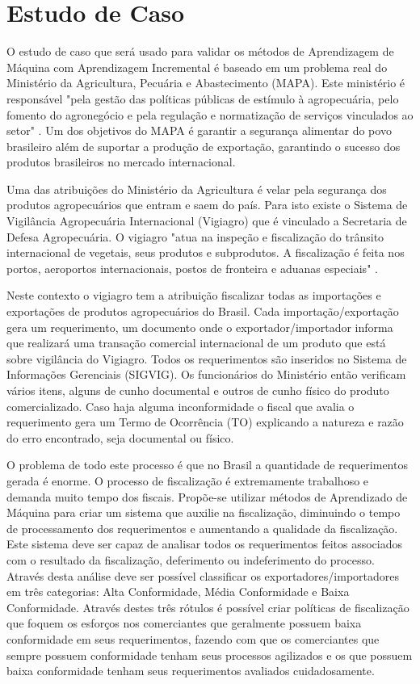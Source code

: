 \chapter{Estudo de Caso}
O estudo de caso que será usado para validar os métodos de Aprendizagem de Máquina com Aprendizagem Incremental é baseado em um problema real do Ministério da Agricultura, Pecuária e Abastecimento (MAPA). Este ministério é responsável  "pela gestão das políticas públicas de estímulo à agropecuária, pelo fomento do agronegócio e pela regulação e normatização de serviços vinculados ao setor" \cite{mapa}. Um dos objetivos do MAPA é garantir a segurança alimentar do povo brasileiro além de suportar a produção de exportação, garantindo o sucesso dos produtos brasileiros no mercado internacional.

Uma das atribuições do Ministério da Agricultura é velar pela segurança dos produtos agropecuários que entram e saem do país. Para isto existe o Sistema de Vigilância Agropecuária Internacional (Vigiagro) que é vinculado a Secretaria de Defesa Agropecuária. O vigiagro "atua na inspeção e fiscalização do trânsito internacional de vegetais, seus produtos e subprodutos. A fiscalização é feita nos portos, aeroportos internacionais, postos de fronteira e aduanas especiais" \cite{vigiagro}.

Neste contexto o vigiagro tem a atribuição fiscalizar todas as importações e exportações de produtos agropecuários do Brasil. Cada importação/exportação gera um requerimento, um documento onde o exportador/importador informa que realizará uma transação comercial internacional de um produto que está sobre vigilância do Vigiagro. Todos os requerimentos são inseridos no Sistema de Informações Gerenciais (SIGVIG). Os funcionários do Ministério então verificam vários itens, alguns de cunho documental e outros de cunho físico do produto comercializado. Caso haja alguma inconformidade o fiscal que avalia o requerimento gera um Termo de Ocorrência (TO) explicando a natureza e razão do erro encontrado, seja documental ou físico.

O problema de todo este processo é que no Brasil a quantidade de requerimentos gerada é enorme. O processo de fiscalização é extremamente trabalhoso e demanda muito tempo dos fiscais. Propõe-se utilizar métodos de Aprendizado de Máquina para criar um sistema que auxilie na fiscalização, diminuindo o tempo de processamento dos requerimentos e aumentando a qualidade da fiscalização. Este sistema deve ser capaz de analisar todos os requerimentos feitos associados com o resultado da fiscalização, deferimento ou indeferimento do processo. Através desta análise deve ser possível classificar os exportadores/importadores em três categorias: Alta Conformidade, Média Conformidade e Baixa Conformidade. Através destes três rótulos é possível criar políticas de fiscalização que foquem os esforços nos comerciantes que geralmente possuem baixa conformidade em seus requerimentos, fazendo com que os comerciantes que sempre possuem conformidade tenham seus processos agilizados e os que possuem baixa conformidade tenham seus requerimentos avaliados cuidadosamente. 

